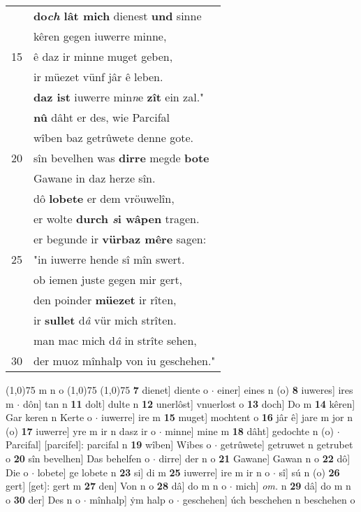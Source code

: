 \documentclass[8pt,a4paper,notitlepage]{article}
\begin{document}
\begin{table}[ht]
\begin{minipage}[t]{0.5\linewidth}
\begin{tabular}{rl}
 & \textbf{do\textit{ch} lât mich} dienest \textbf{und} sinne\\ 
 & kêren gegen iuwerre minne,\\ 
15 & ê daz ir minne muget geben,\\ 
 & ir müezet vünf jâr ê leben.\\ 
 & \textbf{daz ist} iuwerre min\textit{n}e \textbf{zît} ein zal."\\ 
 & \textbf{nû} dâht er des, wie Parcifal\\ 
 & wîben baz getrûwete denne gote.\\ 
20 & sîn bevelhen was \textbf{dirre} megde \textbf{bote}\\ 
 & Gawane in daz herze sîn.\\ 
 & dô \textbf{lobete} er dem vröuwelîn,\\ 
 & er wolte \textbf{durch \textit{s}i wâpen} tragen.\\ 
 & er begunde ir \textbf{vürbaz mêre} sagen:\\ 
25 & "in iuwerre hende sî mîn swert.\\ 
 & ob iemen juste gegen mir gert,\\ 
 & den poinder \textbf{müezet} ir rîten,\\ 
 & ir \textbf{sullet} d\textit{â} vür mich strîten.\\ 
 & man mac mich d\textit{â} in strîte sehen,\\ 
30 & der muoz mînhalp von iu geschehen."\\ 
\end{tabular}
\scriptsize
\line(1,0){75} \newline
m n o \newline
\line(1,0){75} \newline
\newline
\line(1,0){75} \newline
\textbf{7} dienet] diente o  $\cdot$ einer] eines n (o) \textbf{8} iuweres] ires m  $\cdot$ dôn] tan n \textbf{11} dolt] dulte n \textbf{12} unerlôst] vnuerlost o \textbf{13} doch] Do m \textbf{14} kêren] Gar keren n Kerte o  $\cdot$ iuwerre] ire m \textbf{15} muget] mochtent o \textbf{16} jâr ê] jare m jor n (o) \textbf{17} iuwerre] yre m ir n dasz ir o  $\cdot$ minne] mine m \textbf{18} dâht] gedochte n (o)  $\cdot$ Parcifal] [parcifel]: parcifal n \textbf{19} wîben] Wibes o  $\cdot$ getrûwete] getruwet n getrubet o \textbf{20} sîn bevelhen] Das behelfen o  $\cdot$ dirre] der n o \textbf{21} Gawane] Gawan n o \textbf{22} dô] Die o  $\cdot$ lobete] ge lobete n \textbf{23} si] di m \textbf{25} iuwerre] ire m ir n o  $\cdot$ sî] sú n (o) \textbf{26} gert] [get]: gert m \textbf{27} den] Von n o \textbf{28} dâ] do m n o  $\cdot$ mich] \textit{om.} n \textbf{29} dâ] do m n o \textbf{30} der] Des n o  $\cdot$ mînhalp] ẏm halp o  $\cdot$ geschehen] úch beschehen n beschehen o \newline
\end{minipage}
\end{table}
\end{document}
